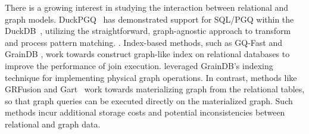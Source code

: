  There is a growing interest in studying the interaction between relational and graph models.
DuckPGQ~\cite{DuckPGQ,DuckPGQ-VLDB} has demonstrated support for SQL/PGQ within the DuckDB~\cite{duckdb}, utilizing the straightforward, graph-agnostic approach to transform and process pattern matching.
.
Index-based methods, such as GQ-Fast \cite{gqfast} and GrainDB \cite{graindb}, work towards construct graph-like index on relational databases to improve the performance of join execution. \name leveraged GrainDB's indexing technique for implementing physical graph operations. In contrast, methods like GRFusion \cite{GRFusion} and Gart~\cite{gart} work towards materializing graph from the relational tables,
so that graph queries can be executed directly on the materialized graph. Such methods incur additional storage costs and potential inconsistencies between relational and graph data.






